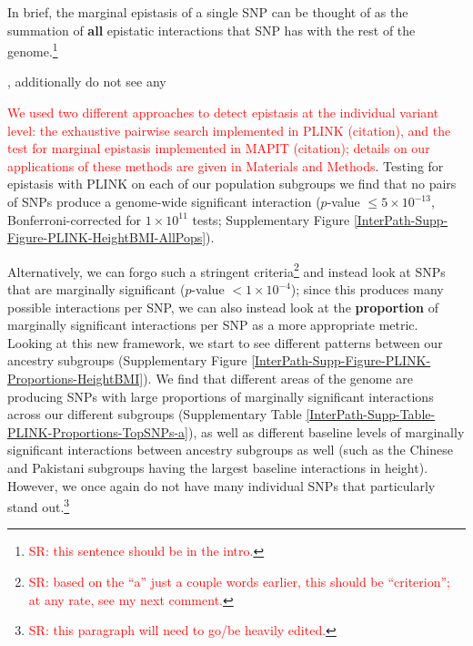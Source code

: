 \documentclass[12pt,a4paper]{article}
\newcommand{\red}[1]{\textcolor{red}{#1}}
\begin{document}
In brief, the marginal epistasis of a single SNP can be thought of as the summation of \textbf{all} epistatic interactions that SNP has with the rest of the genome.\footnote{\red{SR: this sentence should be in the intro.}} %






,  additionally do not see any 


\red{We used two different approaches to detect epistasis at the individual variant level: the exhaustive pairwise search implemented in PLINK (citation), and the test for marginal epistasis implemented in MAPIT (citation); details on our applications of these methods are given in Materials and Methods}. Testing for epistasis with PLINK on each of our population subgroups we find that no pairs of SNPs produce a genome-wide significant interaction ($p$-value $\leq 5\times10^{-13}$, Bonferroni-corrected for $1\times10^{11}$ tests; Supplementary Figure \ref{InterPath-Supp-Figure-PLINK-HeightBMI-AllPops}).

Alternatively, we can forgo such a stringent criteria\footnote{\red{SR: based on the ``a'' just a couple words earlier, this should be ``criterion''; at any rate, see my next comment.}} and instead look at SNPs that are marginally significant ($p$-value $< 1\times10^{-4}$); since this produces many possible interactions per SNP, we can also instead look at the \textbf{proportion} of marginally significant interactions per SNP as a more appropriate metric. Looking at this new framework, we start to see different patterns between our ancestry subgroups (Supplementary Figure \ref{InterPath-Supp-Figure-PLINK-Proportions-HeightBMI}). We find that different areas of the genome are producing SNPs with large proportions of marginally significant interactions across our different subgroups (Supplementary Table \ref{InterPath-Supp-Table-PLINK-Proportions-TopSNPs-a}), as well as different baseline levels of marginally significant interactions between ancestry subgroups as well (such as the Chinese and Pakistani subgroups having the largest baseline interactions in height). However, we once again do not have many individual SNPs that particularly stand out.\footnote{\red{SR: this paragraph will need to go/be heavily edited.}} 
\end{document}
